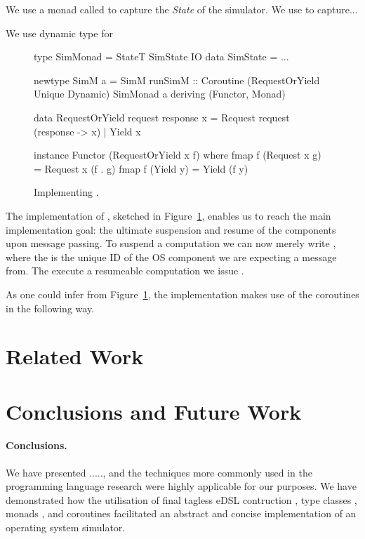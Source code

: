 We use a monad called  to capture the \emph{State}
 of the simulator. We use
 to capture...

We use dynamic type for 

\begin{figure}
\centering
\begin{code*}
type SimMonad  = StateT SimState IO
data SimState = ...

newtype SimM a 
  = SimM { runSimM :: Coroutine 
      (RequestOrYield Unique Dynamic) 
      SimMonad a }
    deriving (Functor, Monad)

data RequestOrYield request response x
  = Request request (response -> x)
  | Yield   x

instance Functor (RequestOrYield x f) where
  fmap f (Request x g) = Request x (f . g)
  fmap f (Yield y)     = Yield (f y)
\end{code*}
\caption{Implementing .}
\label{fig:code-simm}
\end{figure}

The implementation of , sketched in
Figure~\ref{fig:code-simm}, enables us to reach the main
implementation goal: the ultimate suspension and resume of the
components upon message passing.  To suspend a computation we can now
merely write , where the  is
the unique ID of the OS component we are expecting a message from. The
execute a resumeable computation we issue .

As one could infer from Figure~\ref{fig:code-simm}, the implementation
makes use of the coroutines in the following way. 


\section{Related Work}
\label{sec:related-work}


\section{Conclusions and Future Work}
\label{sec:concl-future-work}

\paragraph{Conclusions.}  We have
presented ....., and the techniques more commonly used in the
programming language research were highly applicable for our
purposes. We have demonstrated how the utilisation of final tagless
eDSL contruction \cite{...}, type classes \cite{...}, monads
\cite{...}, and coroutines \cite{...} facilitated an abstract and
concise implementation of an operating system simulator.

